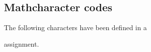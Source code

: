 \subsection{ Mathcharacter codes}

The following characters have been defined
in a
\begin{disp}
\end{disp}
assignment.
\par\leavevmode\par


